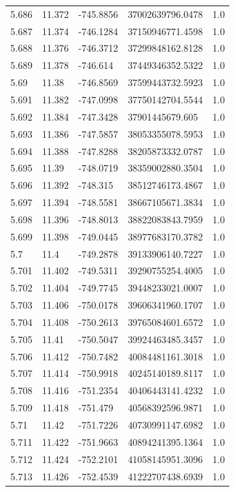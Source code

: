 \begin{tabular}{lllll}
5.686 & 11.372 & -745.8856 & 37002639796.0478 & 1.0 \\
5.687 & 11.374 & -746.1284 & 37150946771.4598 & 1.0 \\
5.688 & 11.376 & -746.3712 & 37299848162.8128 & 1.0 \\
5.689 & 11.378 & -746.614 & 37449346352.5322 & 1.0 \\
5.69 & 11.38 & -746.8569 & 37599443732.5923 & 1.0 \\
5.691 & 11.382 & -747.0998 & 37750142704.5544 & 1.0 \\
5.692 & 11.384 & -747.3428 & 37901445679.605 & 1.0 \\
5.693 & 11.386 & -747.5857 & 38053355078.5953 & 1.0 \\
5.694 & 11.388 & -747.8288 & 38205873332.0787 & 1.0 \\
5.695 & 11.39 & -748.0719 & 38359002880.3504 & 1.0 \\
5.696 & 11.392 & -748.315 & 38512746173.4867 & 1.0 \\
5.697 & 11.394 & -748.5581 & 38667105671.3834 & 1.0 \\
5.698 & 11.396 & -748.8013 & 38822083843.7959 & 1.0 \\
5.699 & 11.398 & -749.0445 & 38977683170.3782 & 1.0 \\
5.7 & 11.4 & -749.2878 & 39133906140.7227 & 1.0 \\
5.701 & 11.402 & -749.5311 & 39290755254.4005 & 1.0 \\
5.702 & 11.404 & -749.7745 & 39448233021.0007 & 1.0 \\
5.703 & 11.406 & -750.0178 & 39606341960.1707 & 1.0 \\
5.704 & 11.408 & -750.2613 & 39765084601.6572 & 1.0 \\
5.705 & 11.41 & -750.5047 & 39924463485.3457 & 1.0 \\
5.706 & 11.412 & -750.7482 & 40084481161.3018 & 1.0 \\
5.707 & 11.414 & -750.9918 & 40245140189.8117 & 1.0 \\
5.708 & 11.416 & -751.2354 & 40406443141.4232 & 1.0 \\
5.709 & 11.418 & -751.479 & 40568392596.9871 & 1.0 \\
5.71 & 11.42 & -751.7226 & 40730991147.6982 & 1.0 \\
5.711 & 11.422 & -751.9663 & 40894241395.1364 & 1.0 \\
5.712 & 11.424 & -752.2101 & 41058145951.3096 & 1.0 \\
5.713 & 11.426 & -752.4539 & 41222707438.6939 & 1.0 \\

\end{tabular}
